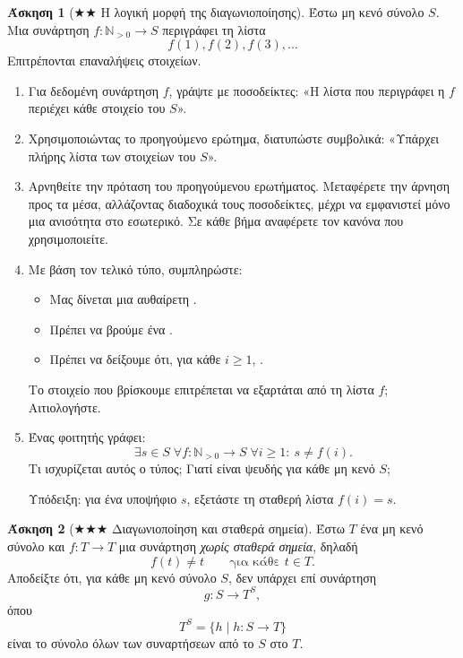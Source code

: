 \documentclass[11pt,a4paper]{article}
\theoremstyle{definition}
\newtheorem{question}{Άσκηση}
\begin{document}
\begin{question}[$\bigstar \bigstar$ Η λογική μορφή της διαγωνιοποίησης]
Έστω μη κενό σύνολο $S$.
Μια συνάρτηση $f:\mathbb N_{>0}\to S$ περιγράφει τη λίστα
\[
f(1),f(2),f(3),\ldots
\]
Επιτρέπονται επαναλήψεις στοιχείων.

\begin{enumerate}
\item Για δεδομένη συνάρτηση $f$, γράψτε με ποσοδείκτες:
«Η λίστα που περιγράφει η $f$ περιέχει κάθε στοιχείο του $S$».

\item Χρησιμοποιώντας το προηγούμενο ερώτημα,
διατυπώστε συμβολικά:
«Υπάρχει πλήρης λίστα των στοιχείων του $S$».

\item Αρνηθείτε την πρόταση του προηγούμενου ερωτήματος.
Μεταφέρετε την άρνηση προς τα μέσα, αλλάζοντας διαδοχικά
τους ποσοδείκτες, μέχρι να εμφανιστεί μόνο μια ανισότητα
στο εσωτερικό.
Σε κάθε βήμα αναφέρετε τον κανόνα που χρησιμοποιείτε.

\item Με βάση τον τελικό τύπο, συμπληρώστε:
\begin{itemize}
    \item Μας δίνεται μια αυθαίρετη \underline{\hspace{25mm}}.
    \item Πρέπει να βρούμε ένα \underline{\hspace{25mm}}.
    \item Πρέπει να δείξουμε ότι, για κάθε $i\ge1$,
          \underline{\hspace{35mm}}.
\end{itemize}
Το στοιχείο που βρίσκουμε επιτρέπεται να εξαρτάται
από τη λίστα $f$; Αιτιολογήστε.

\item Ένας φοιτητής γράφει:
\[
\exists s\in S\;
\forall f:\mathbb N_{>0}\to S\;
\forall i\ge1:\ s\ne f(i).
\]
Τι ισχυρίζεται αυτός ο τύπος;
Γιατί είναι ψευδής για κάθε μη κενό $S$;

Υπόδειξη: για ένα υποψήφιο $s$, εξετάστε
τη σταθερή λίστα $f(i)=s$.
\end{enumerate}
\end{question}





\begin{question}[$\bigstar\bigstar\bigstar$ Διαγωνιοποίηση και σταθερά σημεία]
Έστω $T$ ένα μη κενό σύνολο και $f:T\to T$ μια συνάρτηση
\emph{χωρίς σταθερά σημεία}, δηλαδή
\[
f(t)\ne t \qquad \text{για κάθε }t\in T.
\]
Αποδείξτε ότι, για κάθε μη κενό σύνολο $S$, δεν υπάρχει
επί συνάρτηση
\[
g:S\longrightarrow T^S,
\]
όπου
\[
T^S=\{h\mid h:S\to T\}
\]
είναι το σύνολο όλων των συναρτήσεων από το $S$ στο $T$.
\end{question}
\end{document}
